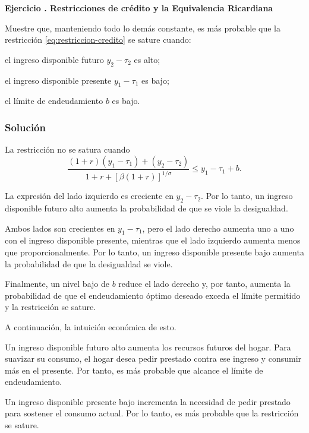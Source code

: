 \documentclass[11pt]{article}
\let\enumerateoriginal\enumerate
\let\endenumerateoriginal\endenumerate
\renewenvironment{enumerate}{%
  \enumerateoriginal
  \setlength{\itemsep}{0.5em}%
  \setlength{\parsep}{0pt}%
  \setlength{\topsep}{0.4em}%
}{\endenumerateoriginal}
\newcounter{problema}
\newenvironment{problema}[1]{%
  \par
  \refstepcounter{problema}%
  \addvspace{0.9em}%
  \noindent\textbf{Ejercicio \theproblema. #1}
  \par\nobreak\smallskip
}{\par}
\begin{document}
\begin{problema}{Restricciones de crédito y la Equivalencia Ricardiana}
\begin{enumerate}
\item Muestre que, manteniendo todo lo demás constante, es más probable que la restricción \eqref{eq:restriccion-credito} se sature cuando:
\begin{enumerate}
\renewcommand{\labelenumii}{\textnormal{(\roman{enumii})}}
\item el ingreso disponible futuro \(y_2-\tau_2\) es alto;
\item el ingreso disponible presente \(y_1-\tau_1\) es bajo;
\item el límite de endeudamiento \(b\) es bajo.
\end{enumerate}

\subsubsection*{Solución}

La restricción no se satura cuando
\[
  \frac{(1+r)(y_1-\tau_1)+(y_2-\tau_2)}
  {1+r+\left[\beta(1+r)\right]^{1/\sigma}}
  \leq
  y_1-\tau_1+b.
\]

La expresión del lado izquierdo es creciente en $y_2-\tau_2$. Por lo tanto, un ingreso disponible futuro alto aumenta la probabilidad de que se viole la desigualdad.

Ambos lados son crecientes en $y_1-\tau_1$, pero el lado derecho aumenta uno a uno con el ingreso disponible presente, mientras que el lado izquierdo aumenta menos que proporcionalmente. Por lo tanto, un ingreso disponible presente bajo aumenta la probabilidad de que la desigualdad se viole.

Finalmente, un nivel bajo de $b$ reduce el lado derecho y, por tanto, aumenta la probabilidad de que el endeudamiento óptimo deseado exceda el límite permitido y la restricción se sature.

A continuación, la intuición económica de esto.

\begin{enumerate}
\renewcommand{\labelenumii}{\textnormal{(\roman{enumii})}}

\item Un ingreso disponible futuro alto aumenta los recursos futuros del hogar. Para suavizar su consumo, el hogar desea pedir prestado contra ese ingreso y consumir más en el presente. Por tanto, es más probable que alcance el límite de endeudamiento.

\item Un ingreso disponible presente bajo incrementa la necesidad de pedir prestado para sostener el consumo actual. Por lo tanto, es más probable que la restricción se sature.


\end{enumerate}
\end{enumerate}
\end{problema}
\end{document}
